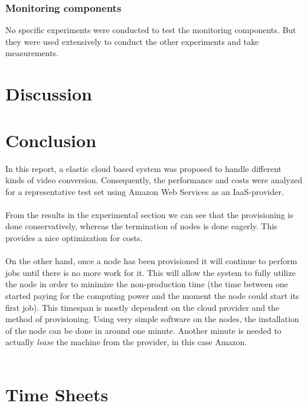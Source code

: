 \documentclass[a4paper]{IEEEtran}
\begin{document}
\subsubsection{Monitoring components}
No specific experiments were conducted to test the monitoring components.
But they were used extensively to conduct the other experiments and take measurements.

\section{Discussion}

\section{Conclusion}

In this report, a elastic cloud based system was proposed to handle different kinds of video conversion.
Consequently, the performance and costs were analyzed for a representative test set using Amazon Web Services as an IaaS-provider.
\\
\\
From the results in the experimental section we can see that the provisioning is done conservatively, whereas the termination of nodes is done eagerly.
This provides a nice optimization for costs.
\\
\\
On the other hand, once a node has been provisioned it will continue to perform jobs until there is no more work for it. 
This will allow the system to fully utilize the node in order to minimize the non-production time (the time between one started paying for the computing power and the moment the node could start its first job).
This timespan is mostly dependent on the cloud provider and the method of provisioning.
Using very simple software on the nodes, the installation of the node can be done in around one minute.
Another minute is needed to actually \textit{lease} the machine from the provider, in this case Amazon.
\\
\\






\appendix
\section{Time Sheets}
\end{document}
